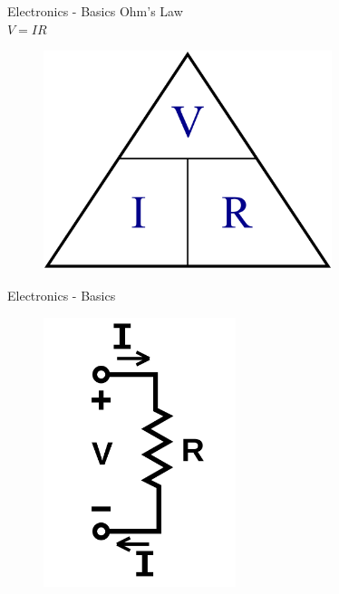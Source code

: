 \documentclass{beamer}
\begin{document}
\begin{frame}{Electronics - Basics}
    Ohm's Law\\
    $V = IR$
    \begin{figure}[h]
        \includegraphics[width=0.75\textwidth]{ohm.png}
    \end{figure}
\end{frame}

\begin{frame}{Electronics - Basics}
    \begin{figure}[h]
        \includegraphics[width=0.5\textwidth]{electronics.png}
    \end{figure}
\end{frame}
\end{document}
